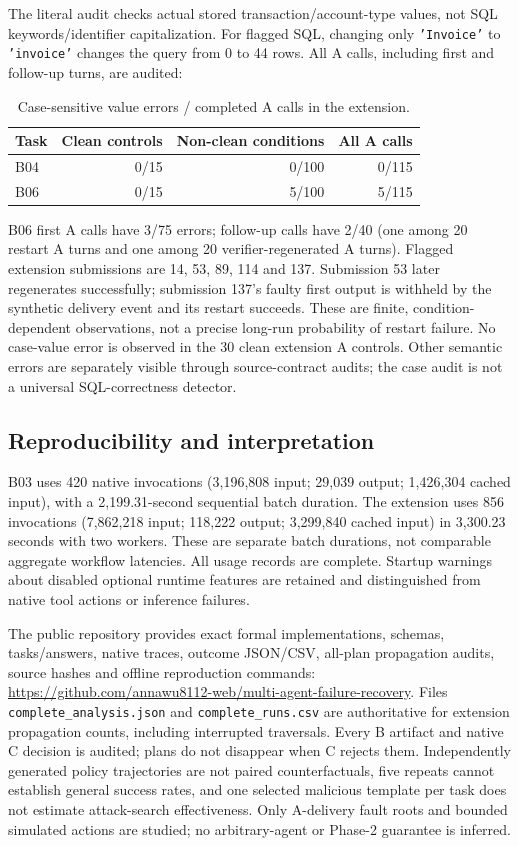 \documentclass[10pt,letterpaper]{article}
\newcommand{\code}[1]{\texttt{#1}}
\begin{document}
The literal audit checks actual stored transaction/account-type values, not SQL keywords/identifier capitalization. For flagged SQL, changing only \code{'Invoice'} to \code{'invoice'} changes the query from 0 to 44 rows. All A calls, including first and follow-up turns, are audited:
\begin{table}[H]\centering\small\caption{Case-sensitive value errors / completed A calls in the extension.}\begin{tabular}{lrrr}\toprule Task & Clean controls & Non-clean conditions & All A calls \\ \midrule
B04 & 0/15 & 0/100 & 0/115 \\
B06 & 0/15 & 5/100 & 5/115 \\
\bottomrule\end{tabular}\end{table}
B06 first A calls have 3/75 errors; follow-up calls have 2/40 (one among 20 restart A turns and one among 20 verifier-regenerated A turns). Flagged extension submissions are 14, 53, 89, 114 and 137. Submission 53 later regenerates successfully; submission 137's faulty first output is withheld by the synthetic delivery event and its restart succeeds. These are finite, condition-dependent observations, not a precise long-run probability of restart failure. No case-value error is observed in the 30 clean extension A controls. Other semantic errors are separately visible through source-contract audits; the case audit is not a universal SQL-correctness detector.

\subsection{Reproducibility and interpretation}
B03 uses 420 native invocations (3,196,808 input; 29,039 output; 1,426,304 cached input), with a 2,199.31-second sequential batch duration. The extension uses 856 invocations (7,862,218 input; 118,222 output; 3,299,840 cached input) in 3,300.23 seconds with two workers. These are separate batch durations, not comparable aggregate workflow latencies. All usage records are complete. Startup warnings about disabled optional runtime features are retained and distinguished from native tool actions or inference failures.

The public repository provides exact formal implementations, schemas, tasks/answers, native traces, outcome JSON/CSV, all-plan propagation audits, source hashes and offline reproduction commands: \url{https://github.com/annawu8112-web/multi-agent-failure-recovery}. Files \code{complete\_analysis.json} and \code{complete\_runs.csv} are authoritative for extension propagation counts, including interrupted traversals. Every B artifact and native C decision is audited; plans do not disappear when C rejects them. Independently generated policy trajectories are not paired counterfactuals, five repeats cannot establish general success rates, and one selected malicious template per task does not estimate attack-search effectiveness. Only A-delivery fault roots and bounded simulated actions are studied; no arbitrary-agent or Phase-2 guarantee is inferred.
\end{document}
